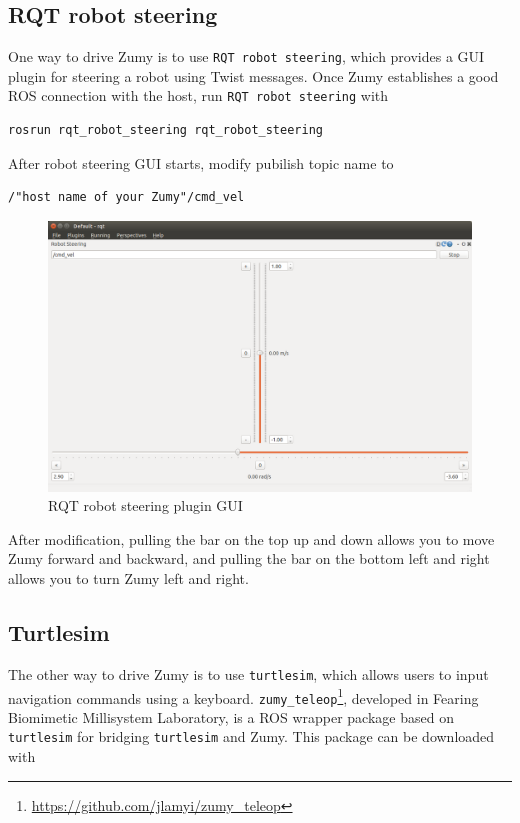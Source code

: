 \documentclass{article}
\begin{document}
\subsection{RQT robot steering}

One way to drive Zumy is to use \verb=RQT robot steering=, which provides a GUI plugin for steering a robot using Twist messages. Once Zumy establishes a good ROS connection with the host, run \verb=RQT robot steering= with

\begin{Verbatim}[frame=single]
rosrun rqt_robot_steering rqt_robot_steering
\end{Verbatim} 
After robot steering GUI starts, modify pubilish topic name to 

\begin{Verbatim}[frame=single]
/"host name of your Zumy"/cmd_vel
\end{Verbatim}

\begin{figure}[h]
\centering
\includegraphics[width=1\textwidth]{img/rqt_robot_steering.png}
\caption{RQT robot steering plugin GUI}
\label{fig:robot_steering}
\end{figure}
After modification, pulling the bar on the top up and down allows you to move Zumy forward and backward, and pulling the bar on the bottom left and right allows you to turn Zumy left and right.


\subsection{Turtlesim}
The other way to drive Zumy is to use \verb=turtlesim=, which allows users to input navigation commands using a keyboard. \verb=zumy_teleop=\footnote{\url{https://github.com/jlamyi/zumy_teleop}}, developed in Fearing Biomimetic Millisystem Laboratory, is a ROS wrapper package based on \verb=turtlesim= for bridging \verb=turtlesim= and Zumy. This package can be downloaded with
\end{document}
